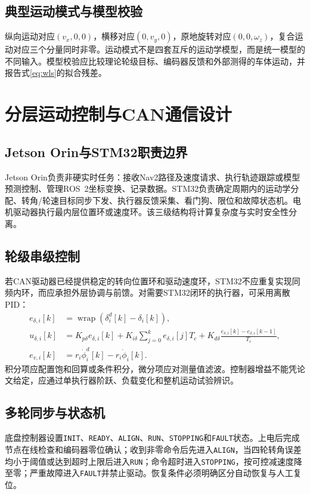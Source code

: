 \documentclass[UTF8,openany,12pt,a4paper]{ctexrep}
\begin{document}
\section{典型运动模式与模型校验}
纵向运动对应$(v_x,0,0)$，横移对应$(0,v_y,0)$，原地旋转对应$(0,0,\omega_z)$，复合运动对应三个分量同时非零。运动模式不是四套互斥的运动学模型，而是统一模型的不同输入。模型校验应比较理论轮级目标、编码器反馈和外部测得的车体运动，并报告式\eqref{eq:wls}的拟合残差。

\chapter{分层运动控制与CAN通信设计}
\section{Jetson Orin与STM32职责边界}
Jetson Orin负责非硬实时任务：接收Nav2路径及速度请求、执行轨迹跟踪或模型预测控制、管理ROS~2坐标变换、记录数据。STM32负责确定周期内的运动学分配、转角/轮速目标同步下发、执行器反馈采集、看门狗、限位和故障状态机。电机驱动器执行最内层位置环或速度环。该三级结构将计算复杂度与实时安全性分离。

\section{轮级串级控制}
若CAN驱动器已经提供稳定的转向位置环和驱动速度环，STM32不应重复实现同频内环，而应承担外层协调与前馈。对需要STM32闭环的执行器，可采用离散PID：
\begin{align}
e_{\delta,i}[k]&=\operatorname{wrap}(\delta_i^d[k]-\delta_i[k]),\\
u_{\delta,i}[k]&=K_{p\delta}e_{\delta,i}[k]+K_{i\delta}\sum_{j=0}^{k}e_{\delta,i}[j]T_c
+K_{d\delta}\frac{e_{\delta,i}[k]-e_{\delta,i}[k-1]}{T_c},\\
e_{v,i}[k]&=r_i\dot\phi_i^d[k]-r_i\dot\phi_i[k].
\end{align}
积分项应配置饱和回算或条件积分，微分项应对测量值滤波。控制器增益不能凭论文给定，应通过单执行器阶跃、负载变化和整机运动试验辨识。

\section{多轮同步与状态机}
底盘控制器设置\texttt{INIT}、\texttt{READY}、\texttt{ALIGN}、\texttt{RUN}、\texttt{STOPPING}和\texttt{FAULT}状态。上电后完成节点在线检查和编码器零位确认；收到非零命令后先进入\texttt{ALIGN}，当四轮转角误差均小于阈值或达到超时上限后进入\texttt{RUN}；命令超时进入\texttt{STOPPING}，按可控减速度降至零；严重故障进入\texttt{FAULT}并禁止驱动。恢复条件必须明确区分自动恢复与人工复位。
\end{document}

